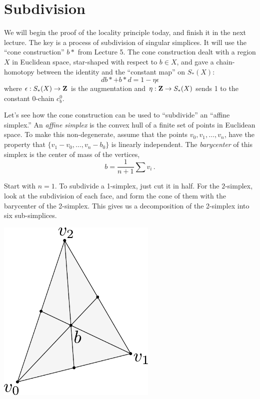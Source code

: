 \section{Subdivision}

We will begin the proof of the locality principle today, 
and finish it in the next lecture.
The key is a process of subdivision of singular simplices. It will use the 
``cone construction'' $b*$ from Lecture 5. The cone construction 
dealt with a region $X$ 
in Euclidean space, star-shaped with respect to $b\in X$, and gave a 
chain-homotopy between the identity and the ``constant map'' on $S_*(X)$:
\[
db*+b*d=1-\eta\epsilon
\]
where $\epsilon:S_*(X)\to\mathbf Z$ is the augmentation and $\eta:\mathbf Z\to S_*(X)$
sends 1 to the constant 0-chain $c_b^0$. 

Let's see how the cone construction can be used to ``subdivide'' an ``affine 
simplex.'' An {\em affine simplex} is the convex hull of a finite set of points in Euclidean space. To make this non-degenerate, assume that the points $v_0,v_1,\ldots,v_n$, have the property that $\{v_1-v_0,\ldots,v_n-b_0\}$ is linearly independent. 
The {\em barycenter} of this simplex is the center of mass of the vertices, 
\[
b=\frac{1}{n+1}\sum{v_i}\,.
\]

Start with $n=1$. To subdivide a 1-simplex, just cut it in half. 
For the $2$-simplex, look at the subdivision of each face, and form the cone
of them with the barycenter of the 2-simplex. This gives us a decomposition of
the 2-simplex into six sub-simplices. 

\begin{center}
\includegraphics[width=3in]{905/Figures/12-subdivision.pdf}
\end{center}

